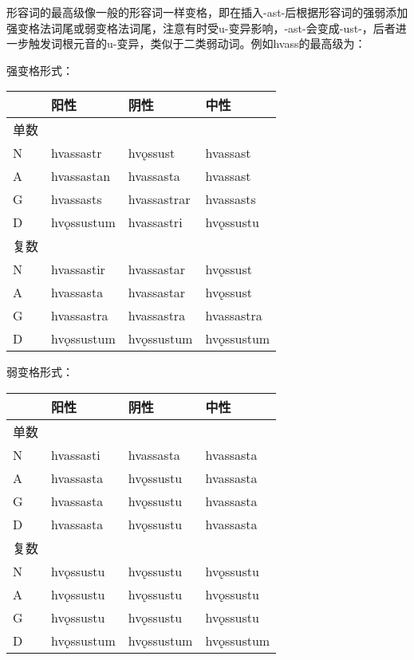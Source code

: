 形容词的最高级像一般的形容词一样变格，即在插入-ast-后根据形容词的强弱添加强变格法词尾或弱变格法词尾，注意有时受u-变异影响，-ast-会变成-ust-，后者进一步触发词根元音的u-变异，类似于二类弱动词。例如hvass的最高级为：

强变格形式：

\begin{longtable}{llll}
  \toprule
     & 阳性         & 阴性          & 中性         \\
  \midrule
  \endhead
  \bottomrule
  \endfoot
  单数 &            &             &            \\
  N  & hvassastr  & hvǫssust    & hvassast   \\
  A  & hvassastan & hvassasta   & hvassast   \\
  G  & hvassasts  & hvassastrar & hvassasts  \\
  D  & hvǫssustum & hvassastri  & hvǫssustu  \\
  复数 &            &             &            \\
  N  & hvassastir & hvassastar  & hvǫssust   \\
  A  & hvassasta  & hvassastar  & hvǫssust   \\
  G  & hvassastra & hvassastra  & hvassastra \\
  D  & hvǫssustum & hvǫssustum  & hvǫssustum \\
\end{longtable}

弱变格形式：

\begin{longtable}{llll}
  \toprule
     & 阳性         & 阴性         & 中性         \\
  \midrule
  \endhead
  \bottomrule
  \endfoot
  单数 &            &            &            \\
  N  & hvassasti  & hvassasta  & hvassasta  \\
  A  & hvassasta  & hvǫssustu  & hvassasta  \\
  G  & hvassasta  & hvǫssustu  & hvassasta  \\
  D  & hvassasta  & hvǫssustu  & hvassasta  \\
  复数 &            &            &            \\
  N  & hvǫssustu  & hvǫssustu  & hvǫssustu  \\
  A  & hvǫssustu  & hvǫssustu  & hvǫssustu  \\
  G  & hvǫssustu  & hvǫssustu  & hvǫssustu  \\
  D  & hvǫssustum & hvǫssustum & hvǫssustum \\
\end{longtable}

